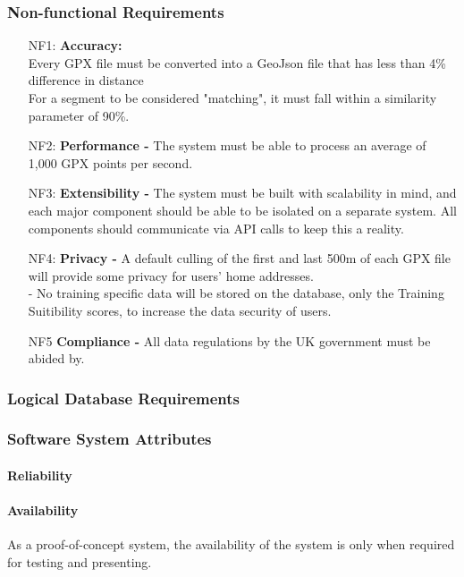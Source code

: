 \documentclass[11pt,twoside]{report}
\begin{document}
\subsubsection{Non-functional Requirements}
\begin{enumerate}
	\item[NF1:] \textbf{Accuracy:} \\
	      \subitem Every GPX file must be converted into a GeoJson file that has less than 4\% difference in distance\\
	      \subitem For a segment \citep{Bicycling2017} to be considered "matching", it must fall within a similarity parameter of 90\%.
	\item[NF2:] \textbf{Performance - } The system must be able to process an average of 1,000 GPX points per second.
	\item[NF3:] \textbf{Extensibility - } The system must be built with scalability in mind, and each major component should be able to be isolated
	      on a separate system. All components should communicate via API calls to keep this a reality.
	\item[NF4:] \textbf{Privacy - } A default culling of the first and last 500m of each GPX file will provide some privacy for users' home addresses.\\
	      - No training specific data will be stored on the database, only the Training Suitibility scores, to increase the data security of
	      users.
	\item[NF5] \textbf{Compliance - } All data regulations by the UK government must be abided by.
\end{enumerate}


\subsubsection{Logical Database Requirements}

\subsubsection{Software System Attributes}
\paragraph{Reliability}

\paragraph{Availability}
As a proof-of-concept system, the availability of the system is only when required for testing and presenting.
\end{document}
